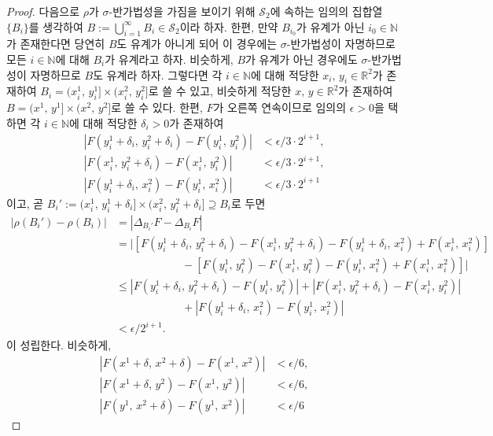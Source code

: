 \begin{proof}
    다음으로 $\rho$가 $\sigma$-반가법성을 가짐을 보이기 위해 $\mathcal{S}_2$에 속하는 임의의 집합열 $\{B_i\}$를 생각하여 $B:=\bigcup_{i=1}^\infty B_i\in\mathcal{S}_2$이라 하자. 한편, 만약 $B_{i_0}$가 유계가 아닌 $i_0\in\mathbb{N}$가 존재한다면 당연히 $B$도 유계가 아니게 되어 이 경우에는 $\sigma$-반가법성이 자명하므로 모든 $i\in\mathbb{N}$에 대해 $B_i$가 유계라고 하자. 비슷하게, $B$가 유계가 아닌 경우에도  $\sigma$-반가법성이 자명하므로 $B$도 유계라 하자. 그렇다면 각 $i\in\mathbb{N}$에 대해 적당한 $x_i,\,y_i\in\mathbb{R}^2$가 존재하여 $B_i=(x_i^1,\,y_i^1]\times(x_i^2,\,y_i^2]$로 쓸 수 있고, 비슷하게 적당한 $x,\,y\in\mathbb{R}^2$가 존재하여 $B=(x^1,\,y^1]\times(x^2,\,y^2]$로 쓸 수 있다. 한편, $F$가 오른쪽 연속이므로 임의의 $\epsilon>0$을 택하면 각 $i\in\mathbb{N}$에 대해 적당한 $\delta_i>0$가 존재하여
    \begin{align*}
        |F(y_i^1+\delta_i,\,y_i^2+\delta_i)-F(y_i^1,\,y_i^2)|&<\epsilon/3\cdot 2^{i+1},\\
        |F(x_i^1,\,y_i^2+\delta_i)-F(x_i^1,\,y_i^2)|&<\epsilon/3\cdot 2^{i+1},\\
        |F(y_i^1+\delta_i,\,x_i^2)-F(y_i^1,\,x_i^2)|&<\epsilon/3\cdot 2^{i+1}
    \end{align*}
    이고, 곧 $B_i':=(x_i^1,\,y_i^1+\delta_i]\times(x_i^2,\,y_i^2+\delta_i]\supseteq B_i$로 두면
    \begin{align*}
        |\rho(B_i')-\rho(B_i)|&=|\Delta_{B_i'}F-\Delta_{B_i}F|\\
        &=|[F(y_i^1+\delta_i,\,y_i^2+\delta_i)-F(x_i^1,\,y_i^2+\delta_i)-F(y_i^1+\delta_i,\,x_i^2)+F(x_i^1,\,x_i^2)]\\
        &\qquad\qquad\qquad-[F(y_i^1,\,y_i^2)-F(x_i^1,\,y_i^2)-F(y_i^1,\,x_i^2)+F(x_i^1,\,x_i^2)]|\\
        &\leq|F(y_i^1+\delta_i,\,y_i^2+\delta_i)-F(y_i^1,\,y_i^2)|+|F(x_i^1,\,y_i^2+\delta_i)-F(x_i^1,\,y_i^2)|\\
        &\qquad\qquad\qquad+|F(y_i^1+\delta_i,\,x_i^2)-F(y_i^1,\,x_i^2)|\\
        &<\epsilon/2^{i+1}.
    \end{align*}
    이 성립한다. 비슷하게,
    \begin{align*}
        |F(x^1+\delta,\,x^2+\delta)-F(x^1,\,x^2)|&<\epsilon/6,\\
        |F(x^1+\delta,\,y^2)-F(x^1,\,y^2)|&<\epsilon/6,\\
        |F(y^1,\,x^2+\delta)-F(y^1,\,x^2)|&<\epsilon/6
    \end{align*}

\end{proof}

